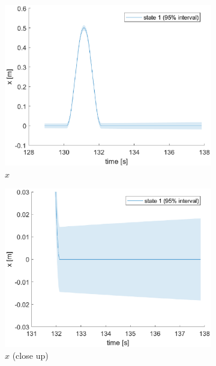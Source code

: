 \documentclass[a4paper,kul]{kulakarticle} %
\begin{document}
\begin{figure}[htp!]
	\centering
	\begin{subfigure}[b]{0.48\textwidth}
		\centering
		\includegraphics[width=\textwidth]{state1_w.eps}
		\caption{$x$}
	\end{subfigure}
	\hfill
	\begin{subfigure}[b]{0.48\textwidth}  
		\centering 
		\includegraphics[width=\textwidth]{state1_w_closeup.eps}
		\caption{$x$ (close up)}
		\label{fig:x_w}
	\end{subfigure}
	\begin{subfigure}[b]{0.48\textwidth}
		\centering

\end{subfigure}
\end{figure}
\end{document}
